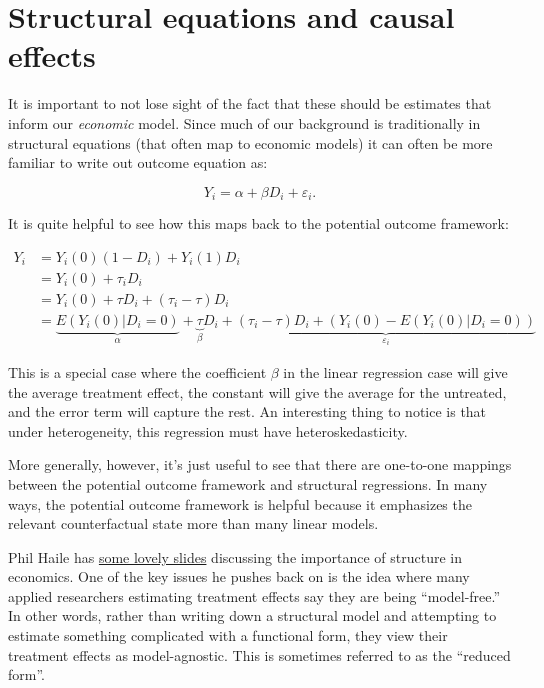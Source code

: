 \documentclass{tufte-handout}
\theoremstyle{break}
\begin{document}
\section{Structural equations and causal effects}
It is important to not lose sight of the fact that these should be estimates that inform our \emph{economic} model. Since much of our background is traditionally in structural equations (that often map to economic models) it can often be more familiar to write out outcome equation as:

\begin{equation*}
  Y_{i} = \alpha + \beta D_{i} + \varepsilon_{i}.
\end{equation*}

It is quite helpful to see how this maps back to the potential outcome framework:

\begin{align*}
  Y_{i} &= Y_{i}(0)(1 - D_{i}) + Y_{i}(1)D_{i}\\
  &= Y_{i}(0) + \tau_{i}D_{i}\\
  &= Y_{i}(0) + \tau D_{i} + (\tau_{i} - \tau)D_{i}\\
  &= \underbrace{E(Y_{i}(0) | D_{i} = 0)}_{\alpha} + \underbrace{\tau}_{\beta} D_{i} + \underbrace{(\tau_{i} - \tau)D_{i} + (Y_{i}(0)-E(Y_{i}(0) | D_{i} = 0))}_{\varepsilon_{i}}
\end{align*}

This is a special case where the coefficient $\beta$ in the linear regression case will give the average treatment effect, the constant will give the average for the untreated, and the error term will capture the rest. An interesting thing to notice is that under heterogeneity, this regression must have heteroskedasticity. 

More generally, however, it's just useful to see that there are one-to-one mappings between the potential outcome framework and structural regressions. In many ways, the potential outcome framework is helpful because it emphasizes the relevant counterfactual state more than many linear models. 

Phil Haile has \href{https://www.princeton.edu/~reddings/tradephd/Haile_theorymeas.pdf}{some lovely slides} discussing the importance of structure in economics. One of the key issues he pushes back on is the idea where many applied researchers estimating treatment effects say they are being ``model-free.'' In other words, rather than writing down a structural model and attempting to estimate something complicated with a functional form, they view their treatment effects as model-agnostic. This is sometimes referred to as the ``reduced form''.
\end{document}

